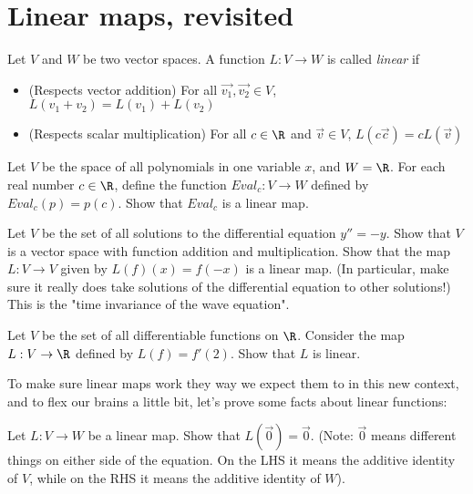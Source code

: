 
\section{Linear maps, revisited}

\begin{definition}
	Let $V$ and $W$ be two vector spaces.  A function $L: V \to W$ is called \textit{linear} if 
	\begin{itemize}
		\item (Respects vector addition) For all $\vec{v_1},\vec{v_2} \in V$, $L(v_1+v_2) = L(v_1)+L(v_2)$
		\item (Respects scalar multiplication) For all $c \in \R$ and $\vec{v} \in V$, $L(c\vec{c}) = cL(\vec{v})$
	\end{itemize}
\end{definition}

\begin{question}
	Let $V$ be the space of all polynomials in one variable $x$, and $W = \R$.  For each real number $c \in \R$, define the function
	$Eval_c: V \to W$ defined by $Eval_c(p) = p(c)$.  Show that $Eval_c$ is a linear map. 
\end{question}

\begin{question}
	Let $V$ be the set of all solutions to the differential equation $y''=-y$.  Show that $V$ is a vector space with function addition and multiplication.
	Show that the map $L:V \to V$ given by $L(f)(x)  = f(-x)$ is a linear map. 
	(In particular, make sure it really does take solutions of the differential equation to other solutions!)
	This is the "time invariance of the wave equation".
\end{question}

\begin{question}
	Let $V$ be the set of all differentiable functions on $\R$.  Consider the map $L:V \to \R$ defined by $L(f) = f'(2)$.  Show that $L$ is linear.
\end{question}

To make sure linear maps work they way we expect them to in this new context, and to flex our brains a little bit, let's prove some facts about linear functions:

\begin{question}
	Let $L:V \to W$ be a linear map.  Show that $L(\vec{0}) = \vec{0}$. 
	(Note: $\vec{0}$ means different things on either side of the equation.  On the LHS it means the additive identity of $V$, while on the RHS it means the 
	additive identity of $W$).
\end{question}


